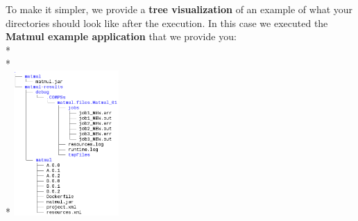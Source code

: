 To make it simpler, we provide a \textbf{tree visualization} of an example of what your directories should look like after the execution.
In this case we executed the \textbf{Matmul example application} that we provide you:
\\*
\\*
\\*
\includegraphics[width=0.3\textwidth]{./Sections/5_Execution_Platforms/Figures/docker-matmul-results-tree.png} 

\clearpage
